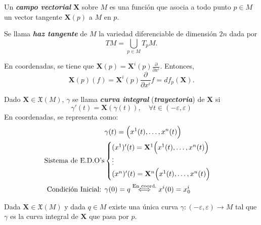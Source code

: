 \begin{definition}
Un \textit{\textbf{campo vectorial}} $\mathbf{X}$ sobre $M$ es una funci\'on que asocia a todo punto $p\in M$ un vector tangente $\mathbf{X}(p)$ a $M$ en $p$.    
\end{definition}

\begin{definition}
Se llama \textit{\textbf{haz tangente}} de $M$ la variedad diferenciable de dimensi\'on $2n$ dada por 
\begin{equation*}
    TM=\bigcup_{p\in M}T_pM.
\end{equation*}
\end{definition}

\begin{observation}
En coordenadas, se tiene que $\mathbf{X}(p)=\mathbf{X}^i(p)\frac{\partial}{\partial x^i}$. Entonces,
\begin{equation}
    \mathbf{X}(p)(f)=\mathbf{X}^i(p)\frac{\partial}{\partial x^i}f=df_p(\mathbf{X}).
\end{equation}
\end{observation}

\begin{definition}
Dado $\mathbf{X}\in\mathfrak{X}(M)$, $\gamma$ se llama \textit{\textbf{curva integral}} (\textit{\textbf{trayectoria}}) de $\mathbf{X}$ si 
\begin{equation}
    \gamma'(t)=\mathbf{X}(\gamma(t)),\quad\forall t\in(-\varepsilon,\varepsilon)
\end{equation}
En coordenadas, se representa como:
\begin{align*}
    &\gamma(t)=\Bigl(x^1(t),\dots,x^n(t)\Bigl)\\
    \text{Sistema de E.D.O's}
    &\begin{cases}
    (x^1)'(t)=\mathbf{X}^1\Bigl(x^1(t),\dots,x^n(t)\Bigl)\\
    \vdots\\
    (x^n)'(t)=\mathbf{X}^n\Bigl(x^1(t),\dots,x^n(t)\Bigl)
    \end{cases}\\
    \text{Condici\'on Inicial: }
    &\gamma(0)=q\overset{\text{En coord.}}{\iff}x^i(0)=x_0^i
\end{align*}
\end{definition}

\begin{theorem}
Dada $\mathbf{X}\in\mathfrak{X}(M)$ y dada $q\in M$ existe una \'unica curva $\gamma\colon(-\varepsilon,\varepsilon)\to M$ tal que $\gamma$ es la curva integral de $\mathbf{X}$ que pasa por $p$.    
\end{theorem}

